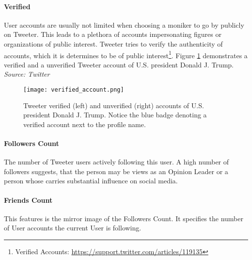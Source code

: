 		\paragraph{Verified}	
			User accounts are usually not limited when choosing a moniker to go by publicly on Tweeter. This leads to a plethora of accounts impersonating figures or organizations of public interest. Tweeter tries to verify the authenticity of accounts, which it is determines to be of public interest\footnote{\hspace{0.01cm} Verified Accounts: \url{https://support.twitter.com/articles/119135}}. Figure \ref{fig:verified_accounts} demonstrates a verified and a unverified Tweeter account of U.S. president Donald J. Trump. \textit{Source: Twitter}
		
	
		\begin{figure}[h]
			\centering
			\captionsetup{width=0.8\textwidth}
			\texttt{[image: verified\_account.png]}
			\caption[Tweeter Verified Accounts]{
				\footnotesize{
					Tweeter verified (left) and unverified (right) accounts of U.S. president Donald J. Trump. Notice the blue badge denoting a verified account next to the profile name.
				}
			} 
			\label{fig:verified_accounts}
		\end{figure}
	
		\paragraph{Followers Count}
			The number of Tweeter users actively following this user. A high number of followers suggests, that the person may be views as an Opinion Leader or a person whose carries substantial influence on social media.
		
		\paragraph{Friends Count}
			This features is the mirror image of the Followers Count. It specifies the number of User accounts the current User is following.
	
